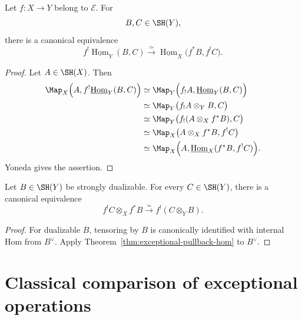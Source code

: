 \begin{theorem}
\label{thm:exceptional-pullback-hom}
Let \(f:X\to Y\) belong to \(\mathcal E\).  For
\[
    B,C\in\SH(Y),
\]
there is a canonical equivalence
\[
    f^!
    \underline{\operatorname{Hom}}_Y(B,C)
    \xrightarrow{\simeq}
    \underline{\operatorname{Hom}}_X
    \bigl(
      f^*B,
      f^!C
    \bigr).
\]
\end{theorem}

\begin{proof}
Let \(A\in\SH(X)\).  Then
\[
\begin{aligned}
    \Map_X
    \Bigl(
      A,
      f^!\underline{\operatorname{Hom}}_Y(B,C)
    \Bigr)
    &\simeq
    \Map_Y
    \Bigl(
      f_!A,
      \underline{\operatorname{Hom}}_Y(B,C)
    \Bigr) \\
    &\simeq
    \Map_Y
    \bigl(
      f_!A\otimes_YB,
      C
    \bigr) \\
    &\simeq
    \Map_Y
    \bigl(
      f_!(A\otimes_Xf^*B),
      C
    \bigr) \\
    &\simeq
    \Map_X
    \bigl(
      A\otimes_Xf^*B,
      f^!C
    \bigr) \\
    &\simeq
    \Map_X
    \Bigl(
      A,
      \underline{\operatorname{Hom}}_X(f^*B,f^!C)
    \Bigr).
\end{aligned}
\]
Yoneda gives the assertion.
\end{proof}

\begin{corollary}
\label{cor:exceptional-dualizable-coefficient}
Let \(B\in\SH(Y)\) be strongly dualizable.  For every \(C\in\SH(Y)\),
there is a canonical equivalence
\[
    f^!C\otimes_Xf^*B
    \xrightarrow{\simeq}
    f^!(C\otimes_YB).
\]
\end{corollary}

\begin{proof}
For dualizable \(B\), tensoring by \(B\) is canonically identified with
internal Hom from \(B^\vee\).  Apply
Theorem~\ref{thm:exceptional-pullback-hom} to \(B^\vee\).
\end{proof}

\section{Classical comparison of exceptional operations}
\label{sec:exceptional-classical-comparison}

